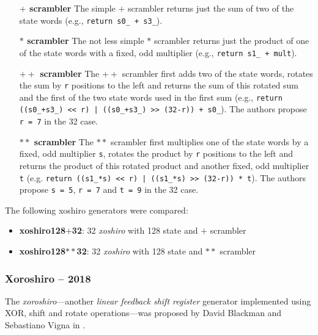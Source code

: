     \begin{itemize}
        \itemsep0em
        \item[\textbf{$\mathbf{+}$ scrambler}]  The simple $\mathbf{+}$ scrambler returns just the sum of two of the state words (e.g., \lstinline|return s0_ + s3_|).
        \item[\textbf{$\mathbf{*}$ scrambler}]  The not less simple $\mathbf{*}$ scrambler returns just the product of one of the state words with a fixed, odd multiplier (e.g., \lstinline|return s1_ + mult|).
        \item[\textbf{$\mathbf{++}$ scrambler}] The $\mathbf{++}$ scrambler first adds two of the state words, rotates the sum by \lstinline|r| positions to the left and returns the sum of this rotated sum and the first of the two state words used in the first sum (e.g., \lstinline{return ((s0_+s3_) << r) | ((s0_+s3_) >> (32-r)) + s0_}). The authors propose \lstinline|r = 7| in the \SI{32}{\bit} case.
        \item[\textbf{$\mathbf{**}$ scrambler}] The $\mathbf{**}$ scrambler first multiplies one of the state words by a fixed, odd multiplier \lstinline|s|, rotates the product by \lstinline|r| positions to the left and returns the product of this rotated product and another fixed, odd multiplier \lstinline|t| (e.g. \lstinline{return ((s1_*s) << r) | ((s1_*s) >> (32-r)) * t}). The authors propose \lstinline|s = 5|, \lstinline|r = 7| and \lstinline|t = 9| in the \SI{32}{\bit} case.
    \end{itemize}

    The following xoshiro generators were compared:
    \begin{itemize}
        \itemsep0em
        \item \textbf{xoshiro128$\mathbf{+}$32}: \SI{32}{\bit} \emph{xoshiro} with \SI{128}{\bit} state and $\mathbf{+}$ scrambler
        \item \textbf{xoshiro128$\mathbf{**}$32}: \SI{32}{\bit} \emph{xoshiro} with \SI{128}{\bit} state and $\mathbf{**}$ scrambler
    \end{itemize}

\subsubsection[Xoroshiro -- 2018]{Xoroshiro -- 2018} \label{subsubsec:xoroshiro}

    The \emph{xoroshiro}---another \emph{linear feedback shift register} generator implemented using XOR, shift and rotate operations---was proposed by David Blackman and Sebastiano Vigna in \cite{Blackman:2018}.

